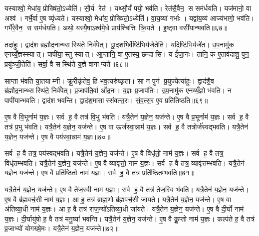 यस्याश्वो॒ मेधा॑य॒ प्रोख्षि॑तो॒ऽध्येति॑। सौ॒र्य रेत॑। यथ्सौ॒र्यं पयो॒ भव॑ति। रेत॑सै॒वैन॒ स सम॑र्धयति। यज॑मानो॒ वा अश्व॑। गर्भै॒र्वा ए॒ष व्यृ॑ध्यते। यस्याश्वो॒ मेधा॑य॒ प्रोख्षि॑तो॒ऽध्येति॑। वा॒य॒व्या॑ गर्भाः। यद्वा॑य॒व्य॑ आज्य॑भागो॒ भव॑ति। गर्भै॑रे॒वैन॒ स सम॑र्धयति। अथो॒ यस्यै॒षाऽश्व॑मे॒धे प्राय॑श्चित्तिः क्रि॒यते। इ॒ष्ट्वा वसी॑यान्भवति॥६७॥\anuvakamend[वि॒न्दत्यश्लो॑णो है॒व भ॑वत्यधी॒यादृ॑ध्यते॒ गर्भै॑रे॒वैन॒ स सम॑र्धयति॒ द्वे च॑]

तदा॑हुः। द्वाद॑श ब्रह्मौद॒नान्थ्सस्थि॑ते॒ निर्व॑पेत्। द्वा॒द॒शभि॒र्वेष्टि॑भिर्यजे॒तेति॑। यदिष्टि॑भि॒र्यजे॑त। उ॒प॒नामु॑क एनय्यँ॒ज्ञस्स्यात्। पापी॑या॒स्तु स्यात्। आ॒प्तानि॒ वा ए॒तस्य॒ छन्दासि। य ई॑जा॒नः। तानि॒ क ए॒ताव॑दाशु॒ पुन॒ प्रयु॑ञ्जी॒तेति॑। सर्वा॒ वै सस्थि॑ते य॒ज्ञे वागाप्यते॥६८॥

साप्ता भ॑वति या॒तयाम्नी। क्रू॒रीकृ॑तेव॒ हि भव॒त्यरु॑ष्कृता। सा न पुन॑ प्र॒युज्येत्या॑हुः। द्वाद॑शै॒व ब्र॑ह्मौद॒नान्थ्सस्थि॑ते॒ निर्व॑पेत्। प्र॒जाप॑ति॒र्वा ओ॑द॒नः। य॒ज्ञः प्र॒जाप॑तिः। उ॒प॒नामु॑क एनय्यँ॒ज्ञो भ॑वति। न पापी॑यान्भवति। द्वाद॑श भवन्ति। द्वाद॑श॒मासास्संवत्स॒रः। सं॒व॒त्स॒र ए॒व प्रति॑तिष्ठति॥६९॥\anuvakamend[आ॒प्य॒ते॒ सं॒व॒त्स॒र एक॑ञ्च]

ए॒ष वै वि॒भूर्नाम॑ य॒ज्ञः। सर्व ह॒ वै तत्र॑ वि॒भु भ॑वति। यत्रै॒तेन॑ य॒ज्ञेन॒ यज॑न्ते। ए॒ष वै प्र॒भूर्नाम॑ य॒ज्ञः। सर्व ह॒ वै तत्र॑ प्र॒भु भ॑वति। यत्रै॒तेन॑ य॒ज्ञेन॒ यज॑न्ते। ए॒ष वा ऊर्ज॑स्वा॒न्नाम॑ य॒ज्ञः। सर्व ह॒ वै तत्रोर्ज॑स्वद्भवति। यत्रै॒तेन॑ य॒ज्ञेन॒ यज॑न्ते। ए॒ष वै पय॑स्वा॒न्नाम॑ य॒ज्ञः॥७०॥

सर्व ह॒ वै तत्र॒ पय॑स्वद्भवति। यत्रै॒तेन॑ य॒ज्ञेन॒ यज॑न्ते। ए॒ष वै विधृ॑तो॒ नाम॑ य॒ज्ञः। सर्व ह॒ वै तत्र॒ विधृ॑तम्भवति। यत्रै॒तेन॑ य॒ज्ञेन॒ यज॑न्ते। ए॒ष वै व्यावृ॑त्तो॒ नाम॑ य॒ज्ञः। सर्व ह॒ वै तत्र॒ व्यावृ॑त्तम्भवति। यत्रै॒तेन॑ य॒ज्ञेन॒ यज॑न्ते। ए॒ष वै प्रति॑ष्ठितो॒ नाम॑ य॒ज्ञः। सर्व ह॒ वै तत्र॒ प्रति॑ष्ठितम्भवति॥७१॥

यत्रै॒तेन॑ य॒ज्ञेन॒ यज॑न्ते। ए॒ष वै ते॑ज॒स्वी नाम॑ य॒ज्ञः। सर्व ह॒ वै तत्र॑ तेज॒स्वि भ॑वति। यत्रै॒तेन॑ य॒ज्ञेन॒ यज॑न्ते। ए॒ष वै ब्र॑ह्मवर्च॒सी नाम॑ य॒ज्ञः। आ ह॒ तत्र॑ ब्राह्म॒णो ब्र॑ह्मवर्च॒सी जा॑यते। यत्रै॒तेन॑ य॒ज्ञेन॒ यज॑न्ते। ए॒ष वा अ॑तिव्या॒धी नाम॑ य॒ज्ञः। आ ह॒ वै तत्र॑ राज॒न्यो॑ऽतिव्या॒धी जा॑यते। यत्रै॒तेन॑ य॒ज्ञेन॒ यज॑न्ते। ए॒ष वै दी॒र्घो नाम॑ य॒ज्ञः। दी॒र्घायु॑षो ह॒ वै तत्र॑ मनु॒ष्या॑ भवन्ति। यत्रै॒तेन॑ य॒ज्ञेन॒ यज॑न्ते। ए॒ष वै कॢ॒प्तो नाम॑ य॒ज्ञः। कल्प॑ते ह॒ वै तत्र॑ प्र॒जाभ्यो॑ योगख्षे॒मः। यत्रै॒तेन॑ य॒ज्ञेन॒ यज॑न्ते॥७२॥

